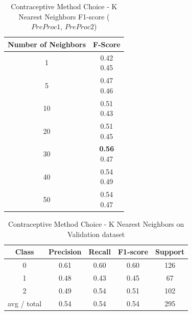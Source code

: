 \begin{table}[p]
\begin{center}
\begin{tabular}{|c|c|}
\hline Number of Neighbors & F-Score \\

\hline 1 & \minibox{0.42\\ 0.45} \\
\hline 5 & \minibox{0.47\\ 0.46} \\
\hline 10 & \minibox{0.51\\ 0.43} \\
\hline 20 & \minibox{0.51\\ 0.45} \\
\hline 30 & \minibox{\textbf{0.56}\\ 0.47} \\
\hline 40 & \minibox{0.54\\ 0.49} \\
\hline 50 & \minibox{0.54\\ 0.47} \\

\hline
\end{tabular}

\caption{Contraceptive Method Choice - K Nearest Neighbors  F1-score ($PreProc1$, $PreProc2$)}
\label{ds1:table:knn}
\end{center}
\end{table}


\begin{table}[p]
\begin{center}
\begin{tabular}{|c|c|c|c|c|}
\hline Class & Precision & Recall & F1-score & Support \\

\hline 0 & 0.61 & 0.60 & 0.60 & 126\\
\hline 1 & 0.48 & 0.43 & 0.45 & 67\\
\hline 2 & 0.49 & 0.54 & 0.51 & 102\\
\hline avg / total & 0.54 & 0.54 & 0.54 & 295\\
\hline
\end{tabular}

\caption{Contraceptive Method Choice - K Nearest Neighbors on Validation dataset}
\label{ds1:table:knn-validation}
\end{center}
\end{table}


